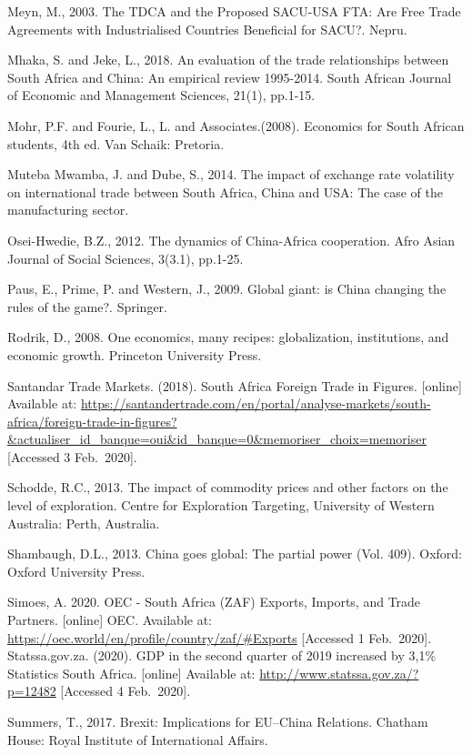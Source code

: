 \documentclass[11pt,preprint, authoryear]{elsarticle}
\numberwithin{equation}{section}
\numberwithin{figure}{section}
\numberwithin{table}{section}
\begin{document}
Meyn, M., 2003. The TDCA and the Proposed SACU-USA FTA: Are Free Trade
Agreements with Industrialised Countries Beneficial for SACU?. Nepru.

Mhaka, S. and Jeke, L., 2018. An evaluation of the trade relationships
between South Africa and China: An empirical review 1995-2014. South
African Journal of Economic and Management Sciences, 21(1), pp.1-15.

Mohr, P.F. and Fourie, L., L. and Associates.(2008). Economics for South
African students, 4th ed. Van Schaik: Pretoria.

Muteba Mwamba, J. and Dube, S., 2014. The impact of exchange rate
volatility on international trade between South Africa, China and USA:
The case of the manufacturing sector.

Osei-Hwedie, B.Z., 2012. The dynamics of China-Africa cooperation. Afro
Asian Journal of Social Sciences, 3(3.1), pp.1-25.

Paus, E., Prime, P. and Western, J., 2009. Global giant: is China
changing the rules of the game?. Springer.

Rodrik, D., 2008. One economics, many recipes: globalization,
institutions, and economic growth. Princeton University Press.

Santandar Trade Markets. (2018). South Africa Foreign Trade in Figures.
{[}online{]} Available at:
\url{https://santandertrade.com/en/portal/analyse-markets/south-africa/foreign-trade-in-figures?\&actualiser_id_banque=oui\&id_banque=0\&memoriser_choix=memoriser}
{[}Accessed 3 Feb.~2020{]}.

Schodde, R.C., 2013. The impact of commodity prices and other factors on
the level of exploration. Centre for Exploration Targeting, University
of Western Australia: Perth, Australia.

Shambaugh, D.L., 2013. China goes global: The partial power (Vol. 409).
Oxford: Oxford University Press.

Simoes, A. 2020. OEC - South Africa (ZAF) Exports, Imports, and Trade
Partners. {[}online{]} OEC. Available at:
\url{https://oec.world/en/profile/country/zaf/\#Exports} {[}Accessed 1
Feb.~2020{]}. Statssa.gov.za. (2020). GDP in the second quarter of 2019
increased by 3,1\% \textbar{} Statistics South Africa. {[}online{]}
Available at: \url{http://www.statssa.gov.za/?p=12482} {[}Accessed 4
Feb.~2020{]}.

Summers, T., 2017. Brexit: Implications for EU--China Relations. Chatham
House: Royal Institute of International Affairs.
\end{document}
